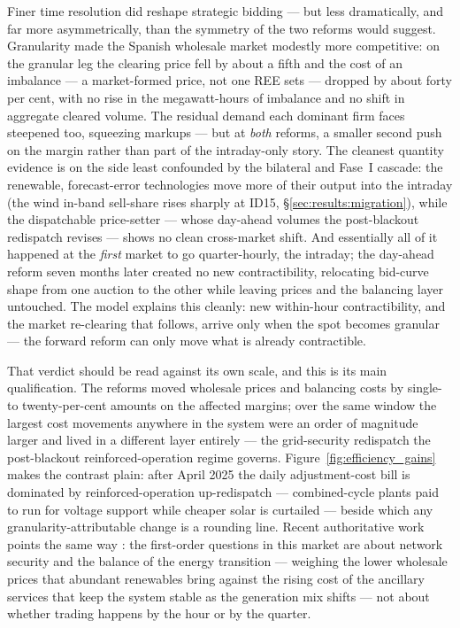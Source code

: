 \documentclass[11pt,a4paper]{article}
\theoremstyle{definition}
\theoremstyle{remark}
\theoremstyle{plain}
\begin{document}
Finer time resolution did reshape strategic bidding --- but less dramatically, and far more asymmetrically, than the symmetry of the two reforms would suggest. Granularity made the Spanish wholesale market modestly more competitive: on the granular leg the clearing price fell by about a fifth and the cost of an imbalance --- a market-formed price, not one REE sets --- dropped by about forty per cent, with no rise in the megawatt-hours of imbalance and no shift in aggregate cleared volume. The residual demand each dominant firm faces steepened too, squeezing markups --- but at \emph{both} reforms, a smaller second push on the margin rather than part of the intraday-only story. The cleanest quantity evidence is on the side least confounded by the bilateral and Fase~I cascade: the renewable, forecast-error technologies move more of their output into the intraday (the wind in-band sell-share rises sharply at ID15, \S\ref{sec:results:migration}), while the dispatchable price-setter --- whose day-ahead volumes the post-blackout redispatch revises --- shows no clean cross-market shift. And essentially all of it happened at the \emph{first} market to go quarter-hourly, the intraday; the day-ahead reform seven months later created no new contractibility, relocating bid-curve shape from one auction to the other while leaving prices and the balancing layer untouched. The model explains this cleanly: new within-hour contractibility, and the market re-clearing that follows, arrive only when the spot becomes granular --- the forward reform can only move what is already contractible.

That verdict should be read against its own scale, and this is its main qualification. The reforms moved wholesale prices and balancing costs by single- to twenty-per-cent amounts on the affected margins; over the same window the largest cost movements anywhere in the system were an order of magnitude larger and lived in a different layer entirely --- the grid-security redispatch the post-blackout reinforced-operation regime governs. Figure~\ref{fig:efficiency_gains} makes the contrast plain: after April 2025 the daily adjustment-cost bill is dominated by reinforced-operation up-redispatch --- combined-cycle plants paid to run for voltage support while cheaper solar is curtailed --- beside which any granularity-attributable change is a rounding line. Recent authoritative work points the same way \citep{brown_reguant_2026, davi_arderius_graf_2026}: the first-order questions in this market are about network security and the balance of the energy transition --- weighing the lower wholesale prices that abundant renewables bring against the rising cost of the ancillary services that keep the system stable as the generation mix shifts --- not about whether trading happens by the hour or by the quarter.
\end{document}
